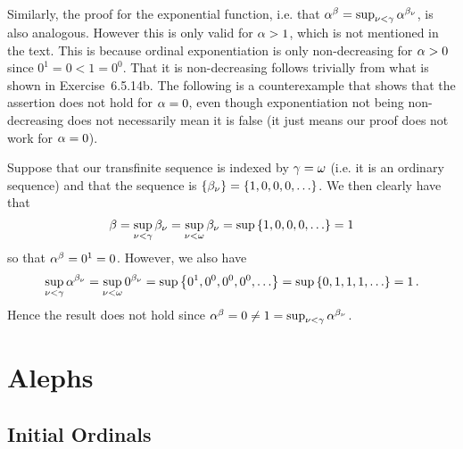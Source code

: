 \begin{questions}
{  Similarly, the proof for the exponential function, i.e. that $\alpha^\beta = \sup_{\nu < \gamma} \alpha^{\beta_\nu}$, is also analogous.
  However this is only valid for $\alpha > 1$, which is not mentioned in the text.
  This is because ordinal exponentiation is only non-decreasing for $\alpha > 0$ since $0^1 = 0 < 1 = 0^0$.
  That it is non-decreasing follows trivially from what is shown in Exercise~6.5.14b.
  The following is a counterexample that shows that the assertion does not hold for $\alpha = 0$, even though exponentiation not being non-decreasing does not necessarily mean it is false (it just means our proof does not work for $\alpha = 0$).

  Suppose that our transfinite sequence is indexed by $\gamma = \omega$ (i.e. it is an ordinary sequence) and that the sequence is $\left\{ \beta_\nu \right\} = \left\{ 1, 0, 0, 0, \ldots \right\}$.
  We then clearly have that
  $$
  \beta = \sup_{\nu < \gamma} \beta_\nu = \sup_{\nu < \omega} \beta_\nu = \sup \left\{ 1, 0, 0, 0, \ldots \right\} = 1
  $$
  so that $\alpha^\beta = 0^1 = 0$.
  However, we also have
  $$
  \sup_{\nu < \gamma} \alpha^{\beta_\nu} = \sup_{\nu < \omega} 0^{\beta_\nu} = \sup\left\{ 0^1, 0^0, 0^0, 0^0, \ldots \right\} = \sup\left\{ 0, 1, 1, 1, \ldots \right\} = 1 \,.
  $$
  Hence the result does not hold since $\alpha^\beta = 0 \neq 1 = \sup_{\nu < \gamma} \alpha^{\beta_\nu}$.
}

\section{Alephs}

\subsection{Initial Ordinals}

\end{questions}
